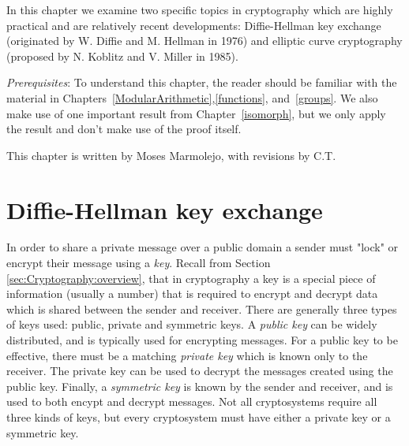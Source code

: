 
In this chapter we examine two specific topics in cryptography which are highly practical and are relatively recent developments: Diffie-Hellman key exchange (originated by W. Diffie and M. Hellman in 1976) and elliptic curve cryptography (proposed by N. Koblitz and V. Miller in 1985).
\medskip

\noindent
\emph{Prerequisites}: 
To understand this chapter, the reader should be familiar with the material in  Chapters~\ref{ModularArithmetic},\ref{functions}, and~\ref{groups}. We also make use of one important result from Chapter~\ref{isomorph}, but we only apply the result and don't make use of the proof itself.  
\bigskip

This chapter is written by Moses Marmolejo, with revisions by C.T.

\section{Diffie-Hellman key exchange}
\label{sec:FurtherCryptography:DiffieHellmanKeyExchange}

In order to share a private message over a public domain a sender must  "lock" or encrypt their message using a \emph{key}.  Recall from Section \ref{sec:Cryptography:overview}, that in cryptography a  key is a special piece of information (usually a number)  that is required to encrypt and decrypt data which is shared between the sender and receiver. There are generally three types of keys used: public, private and symmetric keys. A \emph{public key} can be widely distributed, and is typically used for encrypting messages.  For a public key to be effective, there must be a matching \emph{private key} which is known only to the receiver. The private key can be used to decrypt the messages created using the public key.  Finally, a \emph{symmetric key} is known by the sender and receiver, and is used to both encypt and decrypt messages.  Not all cryptosystems require all three kinds of keys, but every cryptosystem must have either a private key or a symmetric key.

